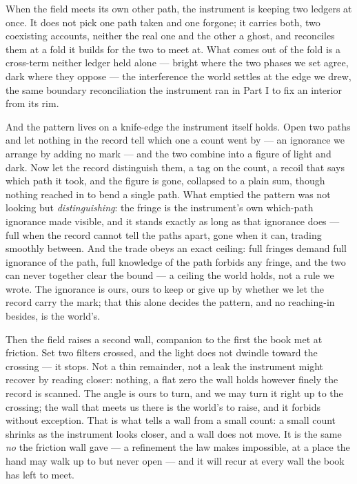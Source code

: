 When the field meets its own other path, the instrument is keeping two ledgers at once. It does not pick one
path taken and one forgone; it carries both, two coexisting accounts, neither the real one and the other a
ghost, and reconciles them at a fold it builds for the two to meet at. What comes out of the fold is a
cross-term neither ledger held alone --- bright where the two phases we set agree, dark where they oppose ---
the interference the world settles at the edge we drew, the same boundary reconciliation the instrument ran in
Part I to fix an interior from its rim.

And the pattern lives on a knife-edge the instrument itself holds. Open two paths and let nothing in the record
tell which one a count went by --- an ignorance we arrange by adding no mark --- and the two combine into a
figure of light and dark. Now let the record distinguish them, a tag on the count, a recoil that says which
path it took, and the figure is gone, collapsed to a plain sum, though nothing reached in to bend a single
path. What emptied the pattern was not looking but \emph{distinguishing}: the fringe is the instrument's own
which-path ignorance made visible, and it stands exactly as long as that ignorance does --- full when the
record cannot tell the paths apart, gone when it can, trading smoothly between. And the trade obeys an exact
ceiling: full fringes demand full ignorance of the path, full knowledge of the path forbids any fringe, and the
two can never together clear the bound --- a ceiling the world holds, not a rule we wrote. The ignorance is
ours, ours to keep or give up by whether we let the record carry the mark; that this alone decides the pattern,
and no reaching-in besides, is the world's.

Then the field raises a second wall, companion to the first the book met at friction. Set two filters crossed,
and the light does not dwindle toward the crossing --- it stops. Not a thin remainder, not a leak the
instrument might recover by reading closer: nothing, a flat zero the wall holds however finely the record is
scanned. The angle is ours to turn, and we may turn it right up to the crossing; the wall that meets us there
is the world's to raise, and it forbids without exception. That is what tells a wall from a small count: a small
count shrinks as the instrument looks closer, and a wall does not move. It is the same \emph{no} the friction
wall gave ---
a refinement the law makes impossible, at a place the hand may walk up to but never open --- and it will recur
at every wall the book has left to meet.

